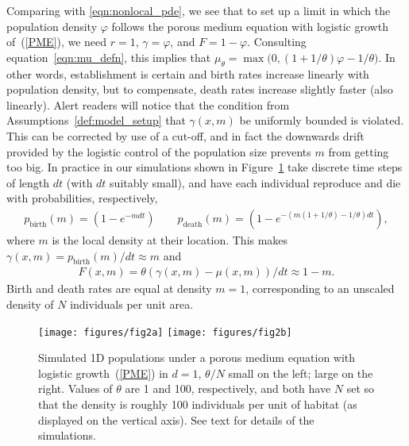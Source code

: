 \documentclass[12pt]{article}
\numberwithin{equation}{section}
\begin{document}
Comparing %
with \eqref{eqn:nonlocal_pde},
we see that to set up a limit in which the population density $\varphi$ follows the 
porous medium equation with logistic growth of~(\ref{PME}),
we need $r=1$,
$\gamma = \varphi$, and $F = 1 - \varphi$.
Consulting equation~\eqref{eqn:mu_defn},
this implies that $\mu_\theta = \max\big(0, (1 + 1/\theta) \varphi - 1/\theta\big)$.
In other words,
establishment is certain
and birth rates increase linearly with population density,
but to compensate, death rates increase slightly faster (also linearly).
Alert readers will notice that
the condition from Assumptions~\ref{def:model_setup} 
that $\gamma(x,m)$ be uniformly bounded 
is violated.
This can be corrected by use of a cut-off, and in fact the downwards drift
provided by the logistic control of the population size prevents $m$ from 
getting too big. 
In practice in our simulations shown in Figure~\ref{fig:pme_waves}
take discrete time steps of length $dt$ (with $dt$ suitably small),
and have each individual reproduce and die with probabilities, respectively,
\begin{align*}
    p_\text{birth}(m) = \left(1 - e^{- m dt}\right)
    \qquad 
    p_\text{death}(m) = \left(1 - e^{- (m (1+1/\theta) - 1/\theta) dt} \right) ,
\end{align*}
where $m$ is the local density at their location.
This makes $\gamma(x, m) = p_\text{birth}(m)/dt \approx m$
and
\begin{align*}
    F(x, m) = \theta(\gamma(x, m) - \mu(x, m)) / dt \approx 1 - m .
\end{align*}
Birth and death rates are equal at density $m = 1$,
corresponding to an unscaled density of $N$ individuals per unit area.

\begin{figure}
    \begin{center}
        \texttt{[image: figures/fig2a]}
        \texttt{[image: figures/fig2b]}
    \end{center}
    \caption{
        Simulated 1D populations under a porous medium equation with logistic growth~(\ref{PME}) in $d=1$,
        $\theta/N$ small on the left; large on the right.
        Values of $\theta$ are 1 and 100, respectively, and both have $N$ set
        so that the density is roughly 100 individuals per unit of habitat
        (as displayed on the vertical axis).
        See text for details of the simulations.
        \label{fig:pme_waves}
    }
\end{figure}
\end{document}
